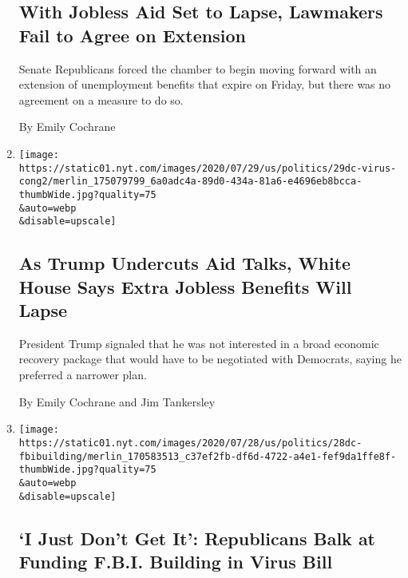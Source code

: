 \begin{enumerate}
  \hypertarget{with-jobless-aid-set-to-lapse-lawmakers-fail-to-agree-on-extension}{%
  \subsection{With Jobless Aid Set to Lapse, Lawmakers Fail to Agree on
  Extension}\label{with-jobless-aid-set-to-lapse-lawmakers-fail-to-agree-on-extension}}

  Senate Republicans forced the chamber to begin moving forward with an
  extension of unemployment benefits that expire on Friday, but there
  was no agreement on a measure to do so.

  By Emily Cochrane
\item
  \href{/2020/07/29/business/economy/virus-aid-trump.html}{}

  \texttt{[image: https://static01.nyt.com/images/2020/07/29/us/politics/29dc-virus-cong2/merlin\_175079799\_6a0adc4a-89d0-434a-81a6-e4696eb8bcca-thumbWide.jpg?quality=75\\\&auto=webp\\\&disable=upscale]}

  \hypertarget{as-trump-undercuts-aid-talks-white-house-says-extra-jobless-benefits-will-lapse}{%
  \subsection{As Trump Undercuts Aid Talks, White House Says Extra
  Jobless Benefits Will
  Lapse}\label{as-trump-undercuts-aid-talks-white-house-says-extra-jobless-benefits-will-lapse}}

  President Trump signaled that he was not interested in a broad
  economic recovery package that would have to be negotiated with
  Democrats, saying he preferred a narrower plan.

  By Emily Cochrane and Jim Tankersley
\item
  \href{/2020/07/28/us/politics/republicans-trump-fbi-building-virus-relief-bill.html}{}

  \texttt{[image: https://static01.nyt.com/images/2020/07/28/us/politics/28dc-fbibuilding/merlin\_170583513\_c37ef2fb-df6d-4722-a4e1-fef9da1ffe8f-thumbWide.jpg?quality=75\\\&auto=webp\\\&disable=upscale]}

  \hypertarget{i-just-dont-get-it-republicans-balk-at-funding-fbi-building-in-virus-bill}{%
  \subsection{`I Just Don't Get It': Republicans Balk at Funding F.B.I.
  Building in Virus
  Bill}\label{i-just-dont-get-it-republicans-balk-at-funding-fbi-building-in-virus-bill}}


\end{enumerate}
